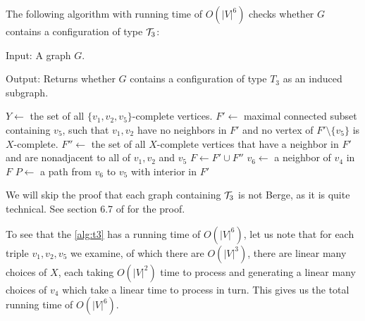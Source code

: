The following algorithm with running time of $O(|V|^6)$ checks whether $G$ contains a configuration of type $\mathcal{T}_3$:

\begin{alg}
	\label{alg:t3}
	Input: A graph $G$.

	\noindent Output: Returns whether $G$ contains a configuration of type $T_3$ as an induced subgraph.
\end{alg}

\begin{algorithmic}[1]
		\ls $Y \gets$ the set of all $\{v_1, v_2, v_5\}$-complete vertices.
			\ls $F' \gets$ maximal connected subset containing $v_5$, such that $v_1, v_2$
			\lsx have no neighbors in $F'$ and no vertex of $F'\setminus\{v_5\}$ is $X$-complete.
			\ls $F'' \gets$ the set of all $X$-complete vertices that have a neighbor in 
			\lsx $F'$ and are nonadjacent to all of $v_1, v_2$ and $v_5$
			\ls $F \gets F' \cup F''$
					\ls $v_6 \gets$ a neighbor of $v_4$ in $F$
							\ls $P \gets$ a path from $v_6$ to $v_5$ with interior in $F'$
							\ls \RETURN \TRUE {}
						\mEndIf
					\mEndFor
				\mEndIf
			\mEndFor
		\mEndFor
	\mEndFor
	\ls \RETURN \FALSE
	\mEndProcedure
\end{algorithmic}

We will skip the proof that each graph containing $\mathcal{T}_3$ is not Berge, as it is quite technical. See section 6.7 of \cite{MC05} for the proof.

\begin{theorem}
	
\end{theorem}

To see that the \cref{alg:t3} has a running time of $O(|V|^6)$, let us note that for each triple $v_1, v_2, v_5$ we examine, of which there are $O(|V|^3)$, there are linear many choices of $X$, each taking $O(|V|^2)$ time to process and generating a linear many choices of $v_4$ which take a linear time to process in turn. This gives us the total running time of $O(|V|^6)$.

